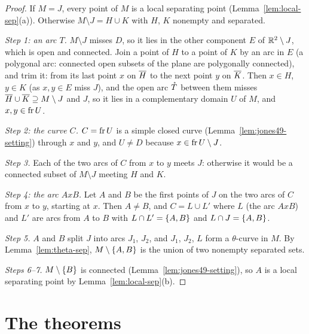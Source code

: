 \begin{proof}
If $M=J$, every point of $M$ is a local separating point (Lemma~\ref{lem:local-sep}(a)). Otherwise $M\setminus J=H\cup K$ with $H$, $K$ nonempty and separated.

\emph{Step 1: an arc $T$.} $M\setminus J$ misses $D$, so it lies in the other component $E$ of $\mathbb{R}^2\setminus J$, which is open and connected. Join a point of $H$ to a point of $K$ by an arc in $E$ (a polygonal arc: connected
open subsets of the plane are polygonally connected), and trim it: from its last point $x$ on $\overline{H}$ to the next point $y$ on $\overline{K}$. Then $x\in H$, $y\in K$ (as $x,y\in E$ miss $J$), and the open arc $\mathring{T}$ between them misses $\overline{H}\cup\overline{K}\supseteq
M\setminus J$ and $J$, so it lies in a complementary domain $U$ of $M$, and $x,y\in\operatorname{fr} U$.

\emph{Step 2: the curve $C$.} $C=\operatorname{fr} U$ is a simple closed curve (Lemma~\ref{lem:jones49-setting}) through $x$ and $y$, and $U\ne D$ because $x\in\operatorname{fr} U\setminus J$.

\emph{Step 3.} Each of the two arcs of $C$ from $x$ to $y$ meets $J$: otherwise it would be a connected subset of $M\setminus J$ meeting $H$ and $K$.

\emph{Step 4: the arc $AxB$.} Let $A$ and $B$ be the first points of $J$ on the two arcs of $C$ from $x$ to $y$, starting at $x$. Then $A\ne B$, and $C=L\cup L'$ where $L$ (the arc $AxB$) and $L'$ are arcs from $A$ to $B$
with $L\cap L'=\left\{ A,B \right\}$ and $L\cap J=\left\{ A,B \right\}$.

\emph{Step 5.} $A$ and $B$ split $J$ into arcs $J_1$, $J_2$, and $J_1$, $J_2$, $L$ form a $\theta$-curve in $M$. By Lemma~\ref{lem:theta-sep}, $M\setminus\left\{ A,B \right\}$ is the union of two nonempty separated sets.

\emph{Steps 6--7.} $M\setminus\left\{ B \right\}$ is connected (Lemma~\ref{lem:jones49-setting}), so $A$ is a local separating point by Lemma~\ref{lem:local-sep}(b).
\end{proof}


\section{The theorems}

